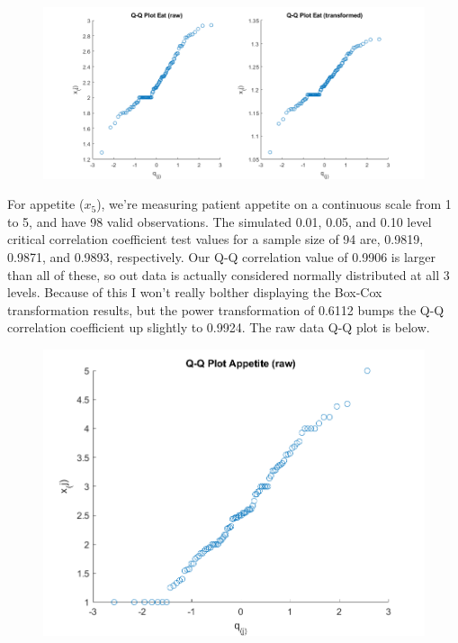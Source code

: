 \begin{center}
    \begin{figure}[H]
        \centering
        \includegraphics[scale=0.4]{./matlab/chapter-4/sol4.32.qq.4.png}
    \end{figure}
\end{center}

For appetite ($x_{5}$), we're measuring patient appetite on a continuous scale from 1 to 5, and have 98 valid observations. The simulated 0.01, 0.05, and 0.10 level critical correlation coefficient test values for a sample size of 94 are, 0.9819, 0.9871, and 0.9893, respectively. Our Q-Q correlation value of 0.9906 is larger than all of these, so out data is actually considered normally distributed at all 3 levels. Because of this I won't really bolther displaying the Box-Cox transformation results, but the power transformation of 0.6112 bumps the Q-Q correlation coefficient up slightly to 0.9924. The raw data Q-Q plot is below.

\begin{center}
    \begin{figure}[H]
        \centering
        \includegraphics[scale=0.6]{./matlab/chapter-4/sol4.32.qq.5.png}
    \end{figure}
\end{center}

